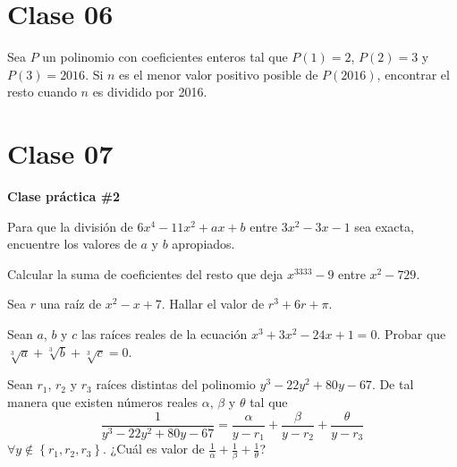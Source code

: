 \section{Clase 06}
    
    \begin{section-problem}
        Sea $P$ un polinomio con coeficientes enteros tal que $P(1) = 2$, $P(2) = 3$ y $P(3) = 2016$.
        Si $n$ es el menor valor positivo posible de $P(2016)$, encontrar el resto cuando $n$ es dividido por 2016.
    \end{section-problem}

\section{Clase 07}
    
    \textbf{Clase práctica \#2}

    \begin{section-problem}
        Para que la división de $6x^4 - 11x^2 + ax + b$ entre $3x^2 - 3x - 1$ sea exacta, encuentre los valores de $a$ y $b$ apropiados.
    \end{section-problem}

    \begin{section-problem}
        Calcular la suma de coeficientes del resto que deja $x^{3333} - 9$ entre $x^2 - 729$.
    \end{section-problem}

    \begin{section-problem}
        Sea $r$ una raíz de $x^2 - x + 7$.
        Hallar el valor de $r^3 + 6r + \pi$.
    \end{section-problem}

    \begin{section-problem}
        Sean $a$, $b$ y $c$ las raíces reales de la ecuación $x^3 + 3x^2 - 24x + 1 = 0$.
        Probar que $\sqrt[3]{a} + \sqrt[3]{b} + \sqrt[3]{c} = 0$.
    \end{section-problem}

    \begin{section-problem}
        Sean $r_1$, $r_2$ y $r_3$ raíces distintas del polinomio $y^3 - 22 y^2 + 80 y - 67$.
        De tal manera que existen números reales $\alpha$, $\beta$ y $\theta$ tal que
        \[\frac{1}{y^3 - 22 y^2 + 80 y - 67} = \frac{\alpha}{y - r_1} + \frac{\beta}{y - r_2} + \frac{\theta}{y - r_3}\]
        $\forall y \notin \left\{ r_1, r_2, r_3 \right\}$.
        ¿Cuál es valor de $\frac{1}{\alpha} + \frac{1}{\beta} + \frac{1}{\theta}$?
    \end{section-problem}

